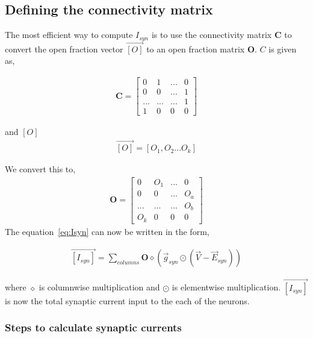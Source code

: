 \documentclass[10pt,letterpaper]{article}
\begin{document}
\begin{nolinenumbers}
\subsection*{Defining the connectivity matrix}
The most efficient way to compute $I_{syn}$ is to use the connectivity matrix $\mathbf{C}$ to convert the open fraction vector $\vec{[O]}$ to an open fraction matrix $\mathbf{O}$. $C$ is given as,

\begin{eqnarray}
\mathbf{C}=
\begin{bmatrix}
0&1&...&0\\
0&0&...&1\\
...&...&...&1\\
1&0&0&0
\end{bmatrix}
\end{eqnarray}

and $[O]$
\begin{eqnarray}\vec{[O]}=[O_1,O_2...O_k]\end{eqnarray}

We convert this to,
\begin{eqnarray}
\mathbf{O}=
\begin{bmatrix}
0&O_1&...&0\\
0&0&...&O_a\\
...&...&...&O_b\\
O_k&0&0&0
\end{bmatrix}
\end{eqnarray}
The equation~\ref{eq:Isyn} can now be written in the form,

\begin{eqnarray}\vec{[I_{syn}]}=\sum_{columns}\mathbf{O}\diamond(\vec{g}_{syn}\odot(\vec{V}-\vec{E}_{syn}))\end{eqnarray}

where $\diamond$ is columnwise multiplication and $\odot$ is elementwise multiplication. $\vec{[I_{syn}]}$ is now the total synaptic current input to the each of the neurons.

\subsubsection*{Steps to calculate synaptic currents}


\end{nolinenumbers}
\end{document}
